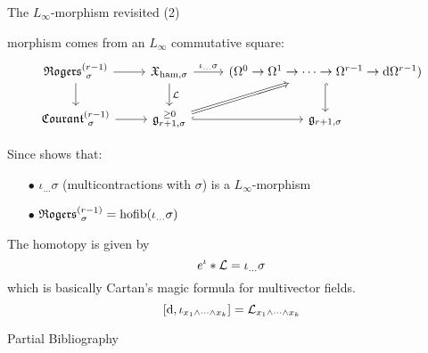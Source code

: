 \documentclass[beamer,10pt]{standalone}
\begin{document}
\begin{frame}{The \cite{Miti2024} $L_\infty$-morphism revisited (2)}
	\begin{thmblock}[{[Fiorenza-M. 2025]}]
	\cite{Miti2024} morphism comes from an $L_\infty$ commutative square:
	\begin{displaymath}
		\begin{tikzcd}[ampersand replacement=\&]
			\Rogers[\sigma]{r-1} \ar[d] \ar[r] \&
			\X_{\ham,\sigma} \ar[r,"\iota_{\dots}\sigma"] \ar[d,"\Lie"]\&
			(\Omega^0\to\Omega^1\to\cdots\to\Omega^{r-1}\to \d \Omega^{r-1}) \ar[d,hook] 
			\\
			\Courant[\sigma]{r-1} \ar[r] \&
			\g_{r+1,\sigma}^{~\geq 0} \ar[r,hook] \ar[ur,Rightarrow]\& 
			\g_{r+1,\sigma}
		\end{tikzcd}
	\end{displaymath}
	\end{thmblock}
	\vfill\pause

	Since \cite{Fiorenza2014a} shows that:
	\begin{itemize}
		\item[$\bullet$] $\iota_{\ldots}\sigma$ (multicontractions with $\sigma$) is a $L_\infty$-morphism
		\item[$\bullet$] $\Rogers[\sigma]{r-1} =\hofib(\iota_{\ldots}\sigma)$ 
	\end{itemize}
	\vfill\pause

	The homotopy is given by $$ e^{\iota} * \Lie = \iota_{\ldots}\sigma$$
	which is basically Cartan's magic formula for multivector fields.
	$$[\d, \iota_{x_1\wedge\cdots\wedge x_k}] = \Lie_{x_1\wedge\cdots\wedge x_k}$$
\end{frame}


 


\ifstandalone
\begin{frame}[t,allowframebreaks]{Partial Bibliography}
	\nocite{Miti2021}
	
	
\end{frame}
\fi
\end{document}
